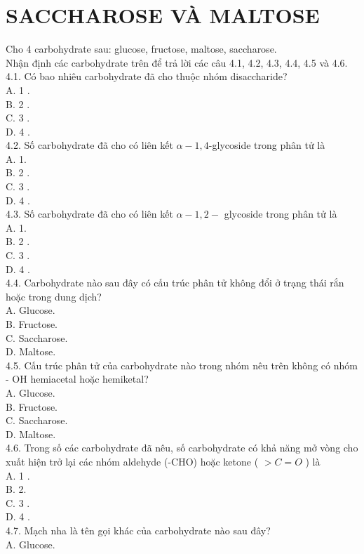 \documentclass[10pt]{article}
\begin{document}
\section*{SACCHAROSE VÀ MALTOSE}
Cho 4 carbohydrate sau: glucose, fructose, maltose, saccharose.\\
Nhận định các carbohydrate trên để trả lời các câu 4.1, 4.2, 4.3, 4.4, 4.5 và 4.6.\\
4.1. Có bao nhiêu carbohydrate đã cho thuộc nhóm disaccharide?\\
A. 1 .\\
B. 2 .\\
C. 3 .\\
D. 4 .\\
4.2. Số carbohydrate đã cho có liên kết $\alpha-1,4$-glycoside trong phân tử là\\
A. 1.\\
B. 2 .\\
C. 3 .\\
D. 4 .\\
4.3. Số carbohydrate đã cho có liên kết $\alpha-1,2-$ glycoside trong phân tử là\\
A. 1.\\
B. 2 .\\
C. 3 .\\
D. 4 .\\
4.4. Carbohydrate nào sau đây có cấu trúc phân tử không đổi ở trạng thái rắn hoặc trong dung dịch?\\
A. Glucose.\\
B. Fructose.\\
C. Saccharose.\\
D. Maltose.\\
4.5. Cấu trúc phân tử của carbohydrate nào trong nhóm nêu trên không có nhóm - OH hemiacetal hoặc hemiketal?\\
A. Glucose.\\
B. Fructose.\\
C. Saccharose.\\
D. Maltose.\\
4.6. Trong số các carbohydrate đã nêu, số carbohydrate có khả năng mở vòng cho xuất hiện trở lại các nhóm aldehyde (-CHO) hoặc ketone ( $>C=O$ ) là\\
A. 1 .\\
B. 2.\\
C. 3 .\\
D. 4 .\\
4.7. Mạch nha là tên gọi khác của carbohydrate nào sau đây?\\
A. Glucose.\\
\end{document}
